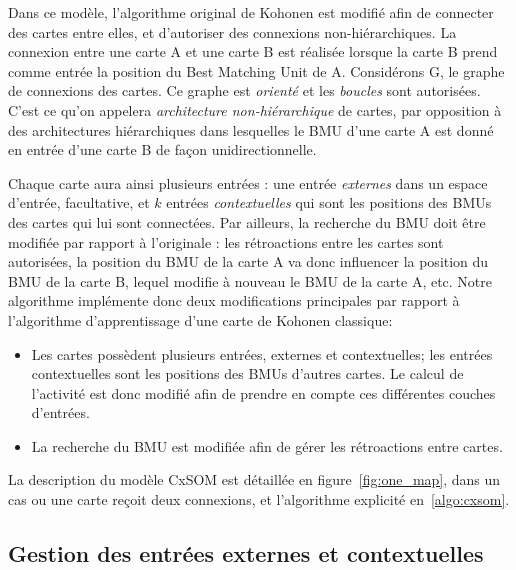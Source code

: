 Dans ce modèle, l'algorithme original de Kohonen est modifié afin de connecter des cartes entre elles, et d'autoriser des connexions non-hiérarchiques.
La connexion entre une carte A et une carte B est réalisée lorsque la carte B prend comme entrée la position du Best Matching Unit de A. 
Considérons G, le graphe de connexions des cartes. Ce graphe est \emph{orienté} et les \emph{boucles} sont autorisées. C'est ce qu'on appelera \emph{architecture non-hiérarchique} de cartes, par opposition à des architectures hiérarchiques dans lesquelles le BMU d'une carte A est donné en entrée d'une carte B de façon unidirectionnelle. 

Chaque carte aura ainsi plusieurs entrées : une entrée \emph{externes} dans un espace d'entrée, facultative, et $k$ entrées \emph{contextuelles} qui sont les positions des BMUs des cartes qui lui sont connectées. Par ailleurs, la recherche du BMU doit être modifiée par rapport à l'originale : les rétroactions entre les cartes sont autorisées, la position du BMU de la carte A va donc influencer la position du BMU de la carte B, lequel modifie à nouveau le BMU de la carte A, etc. 
Notre algorithme implémente donc deux modifications principales par rapport à l'algorithme d'apprentissage d'une carte de Kohonen classique: 
\begin{itemize}
\item Les cartes possèdent plusieurs entrées, externes et contextuelles; les entrées contextuelles sont les positions des BMUs d'autres cartes. Le calcul de l'activité est donc modifié afin de prendre en compte ces différentes couches d'entrées.
\item La recherche du BMU est modifiée afin de gérer les rétroactions entre cartes.
\end{itemize}

La description du modèle CxSOM est détaillée en figure~\ref{fig:one_map}, dans un cas ou une carte reçoit deux connexions, et l'algorithme explicité en~\ref{algo:cxsom}.


\subsection{Gestion des entrées externes et contextuelles}

